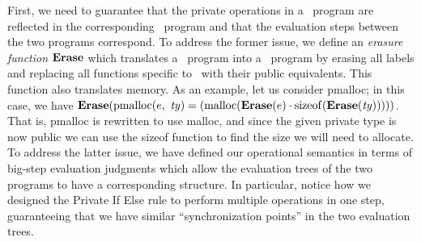 First, we need to guarantee that
the private operations in a \piccoC\ program are reflected in the
corresponding \vanillaC\ program and that the evaluation steps between the two programs correspond. 
To address the former issue, we define an \emph{erasure function} $\bm{\mathrm{Erase}}$ which
translates a \piccoC\ program into a \vanillaC\ program by erasing all
labels and replacing all functions specific to \piccoC\ with their public equivalents. This function also translates memory.
As an example, let us consider
pmalloc; in this case, we have
$\bm{\erasure}({\PMalloc(\Expr,\ \Type)} 
= {(\Malloc(\bm{\erasure}(\Expr) \cdot \sizeof(\bm{\erasure}(\Type))))})$.
That is, pmalloc is rewritten to use malloc, and since the given private type is now public we can use the sizeof function to find the size we will need to allocate. 
To address the latter issue, we have defined our operational semantics in terms of big-step evaluation judgments which allow the evaluation trees of the two programs to have a corresponding structure. In particular, notice how we designed
the Private If Else rule to perform multiple operations in one step, guaranteeing that we have similar ``synchronization points'' in the two evaluation trees. 

